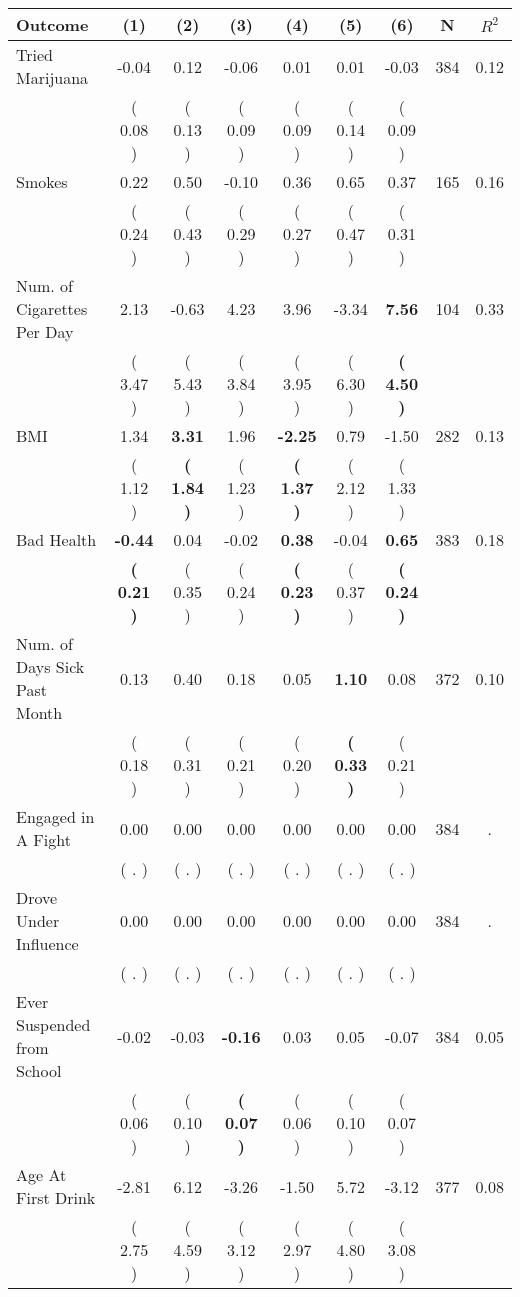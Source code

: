 \begin{tabular}{lcccccccc}
\toprule
 \textbf{Outcome} & \textbf{(1)} & \textbf{(2)} & \textbf{(3)} & \textbf{(4)} & \textbf{(5)} & \textbf{(6)} & \textbf{N} & \textbf{$ R^2$} \\
\midrule
Tried Marijuana &     -0.04 &      0.12 &     -0.06 &      0.01 &      0.01 &     -0.03 & 384 &       0.12 \\ 
 & (     0.08 ) & (     0.13 ) & (     0.09 ) & (     0.09 ) & (     0.14 ) & (     0.09 ) & \\
Smokes &      0.22 &      0.50 &     -0.10 &      0.36 &      0.65 &      0.37 & 165 &       0.16 \\ 
 & (     0.24 ) & (     0.43 ) & (     0.29 ) & (     0.27 ) & (     0.47 ) & (     0.31 ) & \\
Num. of Cigarettes Per Day &      2.13 &     -0.63 &      4.23 &      3.96 &     -3.34 & \textbf{     7.56} & 104 &       0.33 \\ 
 & (     3.47 ) & (     5.43 ) & (     3.84 ) & (     3.95 ) & (     6.30 ) & \textbf{(     4.50 )} & \\
BMI &      1.34 & \textbf{     3.31} &      1.96 & \textbf{    -2.25} &      0.79 &     -1.50 & 282 &       0.13 \\ 
 & (     1.12 ) & \textbf{(     1.84 )} & (     1.23 ) & \textbf{(     1.37 )} & (     2.12 ) & (     1.33 ) & \\
Bad Health & \textbf{    -0.44} &      0.04 &     -0.02 & \textbf{     0.38} &     -0.04 & \textbf{     0.65} & 383 &       0.18 \\ 
 & \textbf{(     0.21 )} & (     0.35 ) & (     0.24 ) & \textbf{(     0.23 )} & (     0.37 ) & \textbf{(     0.24 )} & \\
Num. of Days Sick Past Month &      0.13 &      0.40 &      0.18 &      0.05 & \textbf{     1.10} &      0.08 & 372 &       0.10 \\ 
 & (     0.18 ) & (     0.31 ) & (     0.21 ) & (     0.20 ) & \textbf{(     0.33 )} & (     0.21 ) & \\
Engaged in A Fight &      0.00 &      0.00 &      0.00 &      0.00 &      0.00 &      0.00 & 384 &          . \\ 
 & (        . ) & (        . ) & (        . ) & (        . ) & (        . ) & (        . ) & \\
Drove Under Influence &      0.00 &      0.00 &      0.00 &      0.00 &      0.00 &      0.00 & 384 &          . \\ 
 & (        . ) & (        . ) & (        . ) & (        . ) & (        . ) & (        . ) & \\
Ever Suspended from School &     -0.02 &     -0.03 & \textbf{    -0.16} &      0.03 &      0.05 &     -0.07 & 384 &       0.05 \\ 
 & (     0.06 ) & (     0.10 ) & \textbf{(     0.07 )} & (     0.06 ) & (     0.10 ) & (     0.07 ) & \\
Age At First Drink &     -2.81 &      6.12 &     -3.26 &     -1.50 &      5.72 &     -3.12 & 377 &       0.08 \\ 
 & (     2.75 ) & (     4.59 ) & (     3.12 ) & (     2.97 ) & (     4.80 ) & (     3.08 ) & \\
\bottomrule
\end{tabular}
